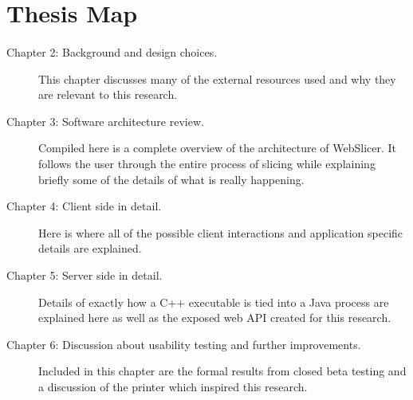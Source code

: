 \section{Thesis Map}
\paragraph{}
\begin{description}
\item [Chapter 2: Background and design choices.]

	This chapter discusses many of the external resources used and why they are relevant to this research.

\item [Chapter 3: Software architecture review.]
	
	Compiled here is a complete overview of the architecture of WebSlicer. It follows the user through the entire process of slicing while explaining briefly some of the details of what is really happening.

\item [Chapter 4: Client side in detail. ]
	
	Here is where all of the possible client interactions and application specific details are explained.

\item [Chapter 5: Server side in detail.]
	
	Details of exactly how a C++ executable is tied into a Java process are explained here as well as the exposed web API created for this research.

\item [Chapter 6: Discussion about usability testing and further improvements.]
	
	Included in this chapter are the formal results from closed beta testing and a discussion of the printer which inspired this research.
	
\end{description}

